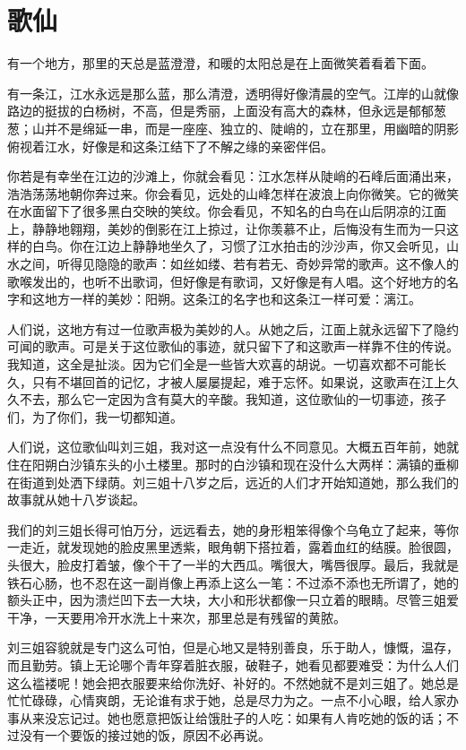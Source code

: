 \chapter{歌仙}

  有一个地方，那里的天总是蓝澄澄，和暖的太阳总是在上面微笑着看着下面。 
 
 有一条江，江水永远是那么蓝，那么清澄，透明得好像清晨的空气。江岸的山就像路边的挺拔的白杨树，不高，但是秀丽，上面没有高大的森林，但永远是郁郁葱葱；山并不是绵延一串，而是一座座、独立的、陡峭的，立在那里，用幽暗的阴影俯视着江水，好像是和这条江结下了不解之缘的亲密伴侣。 
 
 你若是有幸坐在江边的沙滩上，你就会看见：江水怎样从陡峭的石峰后面涌出来，浩浩荡荡地朝你奔过来。你会看见，远处的山峰怎样在波浪上向你微笑。它的微笑在水面留下了很多黑白交映的笑纹。你会看见，不知名的白鸟在山后阴凉的江面上，静静地翱翔，美妙的倒影在江上掠过，让你羡慕不止，后悔没有生而为一只这样的白鸟。你在江边上静静地坐久了，习惯了江水拍击的沙沙声，你又会听见，山水之间，听得见隐隐的歌声：如丝如缕、若有若无、奇妙异常的歌声。这不像人的歌喉发出的，也听不出歌词，但好像是有歌词，又好像是有人唱。这个好地方的名字和这地方一样的美妙：阳朔。这条江的名字也和这条江一样可爱：漓江。 
 
 人们说，这地方有过一位歌声极为美妙的人。从她之后，江面上就永远留下了隐约可闻的歌声。可是关于这位歌仙的事迹，就只留下了和这歌声一样靠不住的传说。我知道，这全是扯淡。因为它们全是一些皆大欢喜的胡说。一切喜欢都不可能长久，只有不堪回首的记忆，才被人屡屡提起，难于忘怀。如果说，这歌声在江上久久不去，那么它一定因为含有莫大的辛酸。我知道，这位歌仙的一切事迹，孩子们，为了你们，我一切都知道。 
 
 人们说，这位歌仙叫刘三姐，我对这一点没有什么不同意见。大概五百年前，她就住在阳朔白沙镇东头的小土楼里。那时的白沙镇和现在没什么大两样：满镇的垂柳在街道到处洒下绿荫。刘三姐十八岁之后，远近的人们才开始知道她，那么我们的故事就从她十八岁谈起。 
 
 我们的刘三姐长得可怕万分，远远看去，她的身形粗笨得像个乌龟立了起来，等你一走近，就发现她的脸皮黑里透紫，眼角朝下搭拉着，露着血红的结膜。脸很圆，头很大，脸皮打着皱，像个干了一半的大西瓜。嘴很大，嘴唇很厚。最后，我就是铁石心肠，也不忍在这一副肖像上再添上这么一笔：不过添不添也无所谓了，她的额头正中，因为溃烂凹下去一大块，大小和形状都像一只立着的眼睛。尽管三姐爱干净，一天要用冷开水洗上十来次，那里总是有残留的黄脓。 
 
 刘三姐容貌就是专门这么可怕，但是心地又是特别善良，乐于助人，慷慨，温存，而且勤劳。镇上无论哪个青年穿着脏衣服，破鞋子，她看见都要难受：为什么人们这么褴褛呢！她会把衣服要来给你洗好、补好的。不然她就不是刘三姐了。她总是忙忙碌碌，心情爽朗，无论谁有求于她，总是尽力为之。一点不小心眼，给人家办事从来没忘记过。她也愿意把饭让给饿肚子的人吃：如果有人肯吃她的饭的话；不过没有一个要饭的接过她的饭，原因不必再说。 
 
